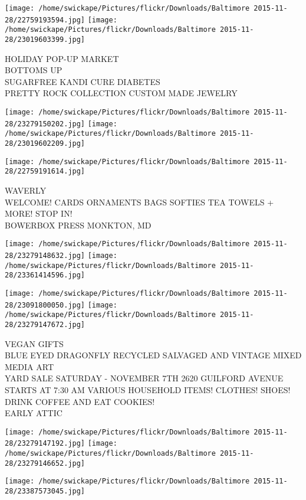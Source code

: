 \documentclass[10pt,letterpaper]{article}
\begin{document}
\texttt{[image: /home/swickape/Pictures/flickr/Downloads/Baltimore 2015-11-28/22759193594.jpg]}
\texttt{[image: /home/swickape/Pictures/flickr/Downloads/Baltimore 2015-11-28/23019603399.jpg]}

HOLIDAY POP{-}UP MARKET\\
BOTTOMS UP\\
SUGARFREE KANDI CURE DIABETES\\
PRETTY ROCK COLLECTION CUSTOM MADE JEWELRY
\pagebreak

\texttt{[image: /home/swickape/Pictures/flickr/Downloads/Baltimore 2015-11-28/23279150202.jpg]}
\texttt{[image: /home/swickape/Pictures/flickr/Downloads/Baltimore 2015-11-28/23019602209.jpg]}

\vspace{0.25in}
\texttt{[image: /home/swickape/Pictures/flickr/Downloads/Baltimore 2015-11-28/22759191614.jpg]}

WAVERLY\\
WELCOME!  CARDS ORNAMENTS BAGS SOFTIES TEA TOWELS + MORE! STOP IN!\\
BOWERBOX PRESS MONKTON, MD
\pagebreak

\texttt{[image: /home/swickape/Pictures/flickr/Downloads/Baltimore 2015-11-28/23279148632.jpg]}
\texttt{[image: /home/swickape/Pictures/flickr/Downloads/Baltimore 2015-11-28/23361414596.jpg]}

\texttt{[image: /home/swickape/Pictures/flickr/Downloads/Baltimore 2015-11-28/23091800050.jpg]}
\texttt{[image: /home/swickape/Pictures/flickr/Downloads/Baltimore 2015-11-28/23279147672.jpg]}

VEGAN GIFTS\\
BLUE EYED DRAGONFLY RECYCLED SALVAGED AND VINTAGE MIXED MEDIA ART\\
YARD SALE SATURDAY {-} NOVEMBER 7TH 2620 GUILFORD AVENUE STARTS AT 7:30 AM VARIOUS HOUSEHOLD ITEMS!  CLOTHES!  SHOES!  DRINK COFFEE AND EAT COOKIES!\\
EARLY ATTIC
\pagebreak

\texttt{[image: /home/swickape/Pictures/flickr/Downloads/Baltimore 2015-11-28/23279147192.jpg]}
\texttt{[image: /home/swickape/Pictures/flickr/Downloads/Baltimore 2015-11-28/23279146652.jpg]}

\texttt{[image: /home/swickape/Pictures/flickr/Downloads/Baltimore 2015-11-28/23387573045.jpg]}
\end{document}
